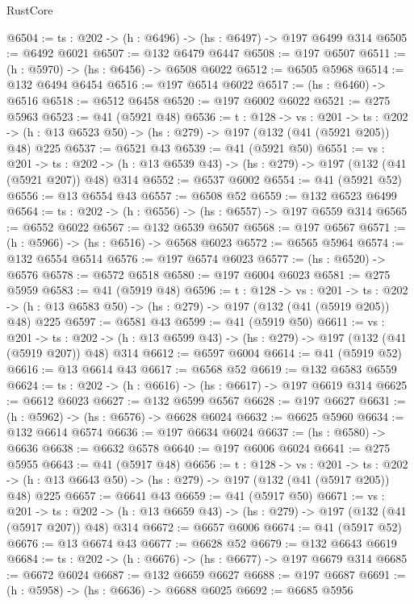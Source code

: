 \begin{lexlean}{RustCore}
\begin{coremodule}
@6504 := {ts : @202} -> (h : @6496) -> (hs : @6497) -> @197 @6499 @314
@6505 := @6492 @6021
@6507 := @132 @6479 @6447
@6508 := @197 @6507
@6511 := (h : @5970) -> (hs : @6456) -> @6508 @6022
@6512 := @6505 @5968
@6514 := @132 @6494 @6454
@6516 := @197 @6514 @6022
@6517 := (hs : @6460) -> @6516
@6518 := @6512 @6458
@6520 := @197 @6002 @6022
@6521 := @275 @5963
@6523 := @41 (@5921 @48)
@6536 := {t : @128} ->
  {vs : @201} ->
  {ts : @202} -> (h : @13 @6523 @50) -> (hs : @279) -> @197 (@132 (@41 (@5921 @205)) @48) @225
@6537 := @6521 @43
@6539 := @41 (@5921 @50)
@6551 := {vs : @201} ->
  {ts : @202} -> (h : @13 @6539 @43) -> (hs : @279) -> @197 (@132 (@41 (@5921 @207)) @48) @314
@6552 := @6537 @6002
@6554 := @41 (@5921 @52)
@6556 := @13 @6554 @43
@6557 := @6508 @52
@6559 := @132 @6523 @6499
@6564 := {ts : @202} -> (h : @6556) -> (hs : @6557) -> @197 @6559 @314
@6565 := @6552 @6022
@6567 := @132 @6539 @6507
@6568 := @197 @6567
@6571 := (h : @5966) -> (hs : @6516) -> @6568 @6023
@6572 := @6565 @5964
@6574 := @132 @6554 @6514
@6576 := @197 @6574 @6023
@6577 := (hs : @6520) -> @6576
@6578 := @6572 @6518
@6580 := @197 @6004 @6023
@6581 := @275 @5959
@6583 := @41 (@5919 @48)
@6596 := {t : @128} ->
  {vs : @201} ->
  {ts : @202} -> (h : @13 @6583 @50) -> (hs : @279) -> @197 (@132 (@41 (@5919 @205)) @48) @225
@6597 := @6581 @43
@6599 := @41 (@5919 @50)
@6611 := {vs : @201} ->
  {ts : @202} -> (h : @13 @6599 @43) -> (hs : @279) -> @197 (@132 (@41 (@5919 @207)) @48) @314
@6612 := @6597 @6004
@6614 := @41 (@5919 @52)
@6616 := @13 @6614 @43
@6617 := @6568 @52
@6619 := @132 @6583 @6559
@6624 := {ts : @202} -> (h : @6616) -> (hs : @6617) -> @197 @6619 @314
@6625 := @6612 @6023
@6627 := @132 @6599 @6567
@6628 := @197 @6627
@6631 := (h : @5962) -> (hs : @6576) -> @6628 @6024
@6632 := @6625 @5960
@6634 := @132 @6614 @6574
@6636 := @197 @6634 @6024
@6637 := (hs : @6580) -> @6636
@6638 := @6632 @6578
@6640 := @197 @6006 @6024
@6641 := @275 @5955
@6643 := @41 (@5917 @48)
@6656 := {t : @128} ->
  {vs : @201} ->
  {ts : @202} -> (h : @13 @6643 @50) -> (hs : @279) -> @197 (@132 (@41 (@5917 @205)) @48) @225
@6657 := @6641 @43
@6659 := @41 (@5917 @50)
@6671 := {vs : @201} ->
  {ts : @202} -> (h : @13 @6659 @43) -> (hs : @279) -> @197 (@132 (@41 (@5917 @207)) @48) @314
@6672 := @6657 @6006
@6674 := @41 (@5917 @52)
@6676 := @13 @6674 @43
@6677 := @6628 @52
@6679 := @132 @6643 @6619
@6684 := {ts : @202} -> (h : @6676) -> (hs : @6677) -> @197 @6679 @314
@6685 := @6672 @6024
@6687 := @132 @6659 @6627
@6688 := @197 @6687
@6691 := (h : @5958) -> (hs : @6636) -> @6688 @6025
@6692 := @6685 @5956

\end{coremodule}
\end{lexlean}

